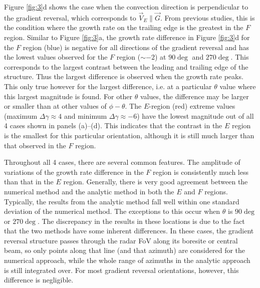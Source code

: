 Figure \ref{fig:3}d shows the case when the convection direction is perpendicular to the gradient reversal, which corresponds to \(\vec{V}_E \parallel \vec{G}\).  From previous studies, this is the condition where the growth rate on the trailing edge is the greatest in the \(F\) region.  Similar to Figure \ref{fig:3}a, the growth rate difference in Figure \ref{fig:3}d for the \(F\) region (blue) is negative for all directions of the gradient reversal and has the lowest values observed for the \(F\) region (\(\sim-2\)) at \(90\deg\) and \(270\deg\). This corresponds to the largest contrast between the leading and trailing edge of the structure. Thus the largest difference is observed when the growth rate peaks. This only true however for the largest difference, i.e. at a particular $\theta$ value where this largest magnitude is found. For other \(\theta\) values, the difference may be larger or smaller than at other values of \(\phi-\theta\). The \(E\)-region (red) extreme values (maximum \(\Delta\gamma\approx 4\) and minimum \(\Delta\gamma\approx -6\)) have the lowest magnitude out of all 4 cases shown in panels (a)--(d).  This indicates that the contrast in the \(E\) region is the smallest for this particular orientation, although it is still much larger than that observed in the \(F\) region.

Throughout all 4 cases, there are several common features. The amplitude of variations of the growth rate difference in the \(F\) region is consistently much less than that in the \(E\) region.  Generally, there is very good agreement between the numerical method and the analytic method in both the \(E\) and \(F\) regions.  Typically, the results from the analytic method fall well within one standard deviation of the numerical method.  The exceptions to this occur when \(\theta\) is \(90\deg\) or \(270\deg\).  The discrepancy in the results in these locations is due to the fact that the two methods have some inherent differences. In these cases, the gradient reversal structure passes through the radar FoV along its boresite or central beam, so only points along that line (and that azimuth) are considered for the numerical approach, while the whole range of azimuths in the analytic approach is still integrated over. For most gradient reversal orientations, however, this difference is negligible.

